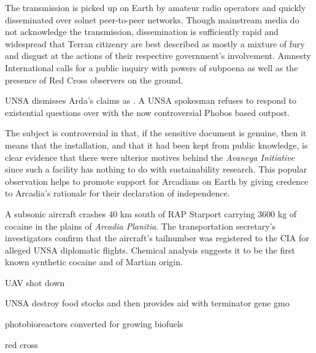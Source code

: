The transmission is picked up on Earth by amateur radio operators and quickly disseminated over solnet peer-to-peer networks. Though mainstream media do not acknowledge the transmission, dissemination is sufficiently rapid and widespread that Terran citizenry are best described as mostly a mixture of fury and disgust at the actions of their respective government's involvement. Amnesty International calls for a public inquiry with powers of subpoena as well as the presence of Red Cross observers on the ground.

UNSA dismisses Arda's claims as . A UNSA spokesman refuses to respond to existential questions over with the now controversial Phobos based outpost. 

The subject is controversial in that, if the sensitive document is genuine, then it means that the installation, and that it had been kept from public knowledge, is clear evidence that there were ulterior motives behind the {\it Avaneya Initiative} since such a facility has nothing to do with sustainability research. This popular observation helps to promote support for Arcadians on Earth by giving credence to Arcadia's rationale for their declaration of independence.
\StopTimelineDate

\StopTimelineDate

A subsonic aircraft crashes 40 km south of RAP Starport carrying 3600 kg of cocaine in the plains of {\it Arcadia Planitia}. The transportation secretary's investigators confirm that the aircraft's tailnumber was registered to the CIA for alleged UNSA diplomatic flights. Chemical analysis suggests it to be the first known synthetic cocaine and of Martian origin.
\StopTimelineDate

UAV shot down

UNSA destroy food stocks and then provides aid with terminator gene gmo

photobioreactors converted for growing biofuels

red cross

